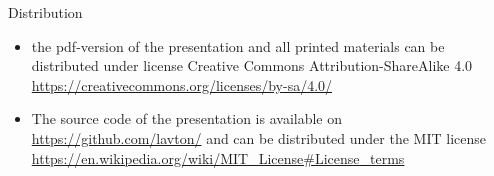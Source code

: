 \documentclass[14pt, aspectratio=169]{beamer}
\begin{document}
\begin{frame}{Distribution}\relax
\begin{itemize}
     \item the pdf-version of the presentation and all printed materials can be distributed under license Creative Commons Attribution-ShareAlike 4.0 \url{https://creativecommons.org/licenses/by-sa/4.0/}
     \item The source code of the presentation is available on \url{https://github.com/lavton/} and can be distributed under the MIT license \url{https://en.wikipedia.org/wiki/MIT_License#License_terms}
\end{itemize}
     
\end{frame}
\end{document}
